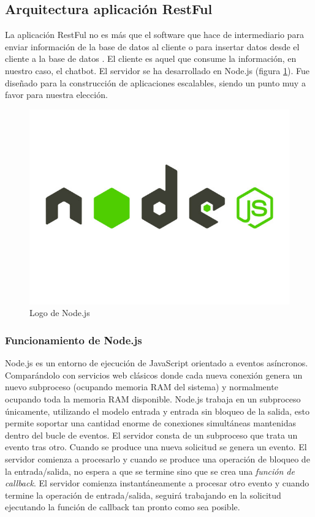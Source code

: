 \subsection{Arquitectura aplicación RestFul}

La aplicación RestFul no es más que el software que hace de intermediario para enviar información de la base de datos al cliente o para insertar datos desde el cliente a la base de datos \cite{apiRest}. El cliente es aquel que consume la información, en nuestro caso, el chatbot. El servidor se ha desarrollado en Node.js (figura \ref{fig:node}). Fue diseñado para la construcción de aplicaciones escalables, siendo un punto muy a favor para nuestra elección. 

\begin{figure}[H]
    \centering
    \includegraphics[scale=0.15]{include/figuras/node.jpg}
    \caption{Logo de Node.js}
    \label{fig:node}
\end{figure}

\subsubsection{Funcionamiento de Node.js}

Node.js es un entorno de ejecución de JavaScript \cite{javascript} orientado a eventos asíncronos. Comparándolo con servicios web clásicos donde cada nueva conexión genera un nuevo subproceso (ocupando memoria RAM del sistema) y normalmente ocupando toda la memoria RAM disponible. Node.js trabaja en un subproceso únicamente, utilizando el modelo entrada y entrada sin bloqueo de la salida, esto permite soportar una cantidad enorme de conexiones simultáneas mantenidas dentro del bucle de eventos. El servidor consta de un subproceso que trata un evento tras otro.
Cuando se produce una nueva solicitud se genera un evento. El servidor comienza a procesarlo y cuando se produce una operación de bloqueo de la entrada/salida, no espera a que se termine sino que se crea una \textit{función de callback}. El servidor comienza instantáneamente a procesar otro evento y cuando termine la operación de entrada/salida, seguirá trabajando en la solicitud ejecutando la función de callback tan pronto como sea posible.

